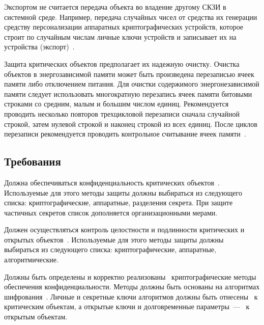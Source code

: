 Экспортом не считается передача объекта во владение другому СКЗИ в системной
среде.
%
Например, передача случайных чисел от средства их генерации средству
персонализации аппаратных криптографических устройств, которое строит по 
случайным числам личные ключи устройств и записывает их на устройства
(экспорт)~. 

Защита критических объектов предполагает их надежную очистку.
%
Очистка объектов в энергозависимой памяти может быть произведена перезаписью 
ячеек памяти либо отключением питания.
%
Для очистки содержимого энергонезависимой памяти следует использовать
многократную перезапись ячеек памяти битовыми строками со средним, малым и 
большим числом единиц. Рекомендуется проводить несколько повторов трехцикловой 
перезаписи сначала случайной строкой, затем нулевой строкой и 
наконец строкой из всех единиц. 
%
После циклов перезаписи рекомендуется проводить контрольное считывание ячеек 
памяти~.

\subsection{Требования}\label{DP.Reqs}

\label{R.DP.Crit} %
Должна обеспечиваться конфиденциальность критических объектов~.
%
Используемые для этого методы защиты должны выбираться из следующего списка:
криптографические, аппаратные, разделения секрета.
%
При защите частичных секретов список дополняется организационными мерами.
%

\label{R.DP.Public} %
Должен осуществляться контроль целостности и подлинности критических и открытых
объектов~. 
%
Используемые для этого методы защиты должны выбираться из следующего списка: 
криптографические, аппаратные, алгоритмические.
%

\label{R.DP.CryptoE} %
Должны быть определены и корректно 
реализованы~ 
криптографические методы обеспечения конфиденциальности.
%
Методы должны быть основаны на алгоритмах шифрования~.
%
Личные и секретные ключи алгоритмов должны быть 
отнесены~ к критическим объектам, а открытые 
ключи и долговременные параметры~--- ~к открытым объектам. 


